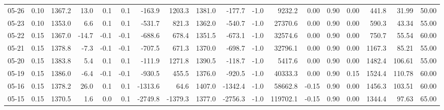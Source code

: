 \begin{threeparttable}
{\begin{tabular}{lrrrrrrrrrrrrrrrrr}
  05-26 &     0.10 & 1367.2 &              13.0 &               0.1 &                0.1 &             -163.9 &  1203.3 & 1381.0 &     -177.7 &                     -1.0 &              9232.2 &       0.00 &      0.90 &           0.00 &            441.8 &           31.99 &                  50.00 \\
  05-23 &     0.10 & 1353.0 &               6.6 &               0.1 &                0.1 &             -531.7 &   821.3 & 1362.0 &     -540.7 &                     -1.0 &             27370.6 &       0.00 &      0.90 &           0.00 &            590.3 &           43.34 &                  55.00 \\
  05-22 &     0.15 & 1367.0 &             -14.7 &              -0.1 &               -0.1 &             -688.6 &   678.4 & 1351.5 &     -673.1 &                     -1.0 &             32574.6 &       0.00 &      0.90 &           0.00 &            750.7 &           55.54 &                  60.00 \\
  05-21 &     0.15 & 1378.8 &              -7.3 &              -0.1 &               -0.1 &             -707.5 &   671.3 & 1370.0 &     -698.7 &                     -1.0 &             32796.1 &       0.00 &      0.90 &           0.00 &           1167.3 &           85.21 &                  55.00 \\
  05-20 &     0.15 & 1383.8 &               5.4 &               0.1 &                0.1 &             -111.9 &  1271.8 & 1390.5 &     -118.7 &                     -1.0 &              5417.6 &       0.00 &      0.90 &           0.00 &           1482.4 &          106.61 &                  55.00 \\
  05-19 &     0.15 & 1386.0 &              -6.4 &              -0.1 &               -0.1 &             -930.5 &   455.5 & 1376.0 &     -920.5 &                     -1.0 &             40333.3 &       0.00 &      0.90 &           0.15 &           1524.4 &          110.78 &                  60.00 \\
  05-16 &     0.15 & 1378.2 &              26.0 &               0.1 &                0.1 &            -1313.6 &    64.6 & 1407.0 &    -1342.4 &                     -1.0 &             58662.8 &      -0.15 &      0.90 &           0.00 &           1456.3 &          103.51 &                  60.00 \\
  05-15 &     0.15 & 1370.5 &               1.6 &               0.0 &                0.1 &            -2749.8 & -1379.3 & 1377.0 &    -2756.3 &                     -1.0 &            119702.1 &      -0.15 &      0.90 &           0.00 &           1344.4 &           97.63 &                  65.00 \\

\end{tabular}}
\end{threeparttable}
